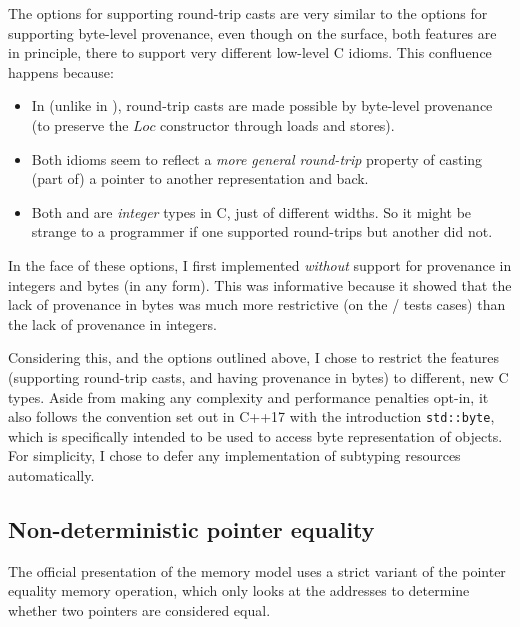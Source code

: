 The options for supporting round-trip casts are very similar to the options for
supporting byte-level provenance, even though on the surface, both features are
in principle, there to support very different low-level C idioms. This confluence
happens because:
\begin{itemize}
    \item In  (unlike in ), round-trip casts are made
        possible by byte-level provenance (to preserve the $\mathit{Loc}$
        constructor through loads and stores).
    \item Both idioms seem to reflect a \emph{more general round-trip} property
        of casting (part of) a pointer to another representation and back.
    \item Both  and  are \emph{integer} types in
        C, just of different widths. So it might be strange to a programmer if
        one supported round-trips but another did not.
\end{itemize}

In the face of these options, I first implemented  \emph{without}
support for provenance in integers and bytes (in any form). This was
informative because it showed that the lack of provenance in bytes was much
more restrictive (on the / tests cases) than the lack
of provenance in integers.

Considering this, and the options outlined above, I chose to restrict
the features (supporting round-trip casts, and having provenance in
bytes) to different, new C types. Aside from making any complexity and
performance penalties opt-in, it also follows the convention set out in C++17
with the introduction \texttt{std::byte}, which is specifically
intended to be used to access byte representation of objects. For simplicity, I
chose to defer any implementation of subtyping resources automatically.

\subsection{Non-deterministic pointer equality}\label{subsec:non-det-ptr-eq}

The official presentation of the  memory model uses a strict variant of
the pointer equality memory operation, which only looks at the addresses to
determine whether two pointers are considered equal.

